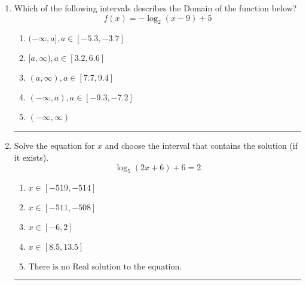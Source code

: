 \documentclass[14pt]{extbook}
\newcommand{\litem}[1]{\item#1\hspace*{-1cm}\rule{\textwidth}{0.4pt}}
\begin{document}
\begin{enumerate}
{\begin{enumerate}[label=\Alph*.]
\end{enumerate} }
\litem{
Which of the following intervals describes the Domain of the function below?\[ f(x) = -\log_2{(x-9)}+5 \]\begin{enumerate}[label=\Alph*.]
\item \( (-\infty, a], a \in [-5.3, -3.7] \)
\item \( [a, \infty), a \in [3.2, 6.6] \)
\item \( (a, \infty), a \in [7.7, 9.4] \)
\item \( (-\infty, a), a \in [-9.3, -7.2] \)
\item \( (-\infty, \infty) \)

\end{enumerate} }
\litem{
Solve the equation for $x$ and choose the interval that contains the solution (if it exists).\[ \log_{5}{(2x+6)}+6 = 2 \]\begin{enumerate}[label=\Alph*.]
\item \( x \in [-519, -514] \)
\item \( x \in [-511, -508] \)
\item \( x \in [-6, 2] \)
\item \( x \in [8.5, 13.5] \)
\item \( \text{There is no Real solution to the equation.} \)

\end{enumerate} }
\end{enumerate}
\end{document}
